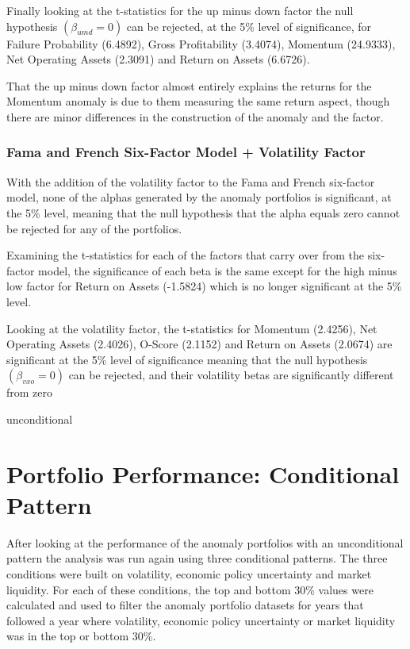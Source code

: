 \documentclass[12pt, a4paper, oneside]{article}
\begin{document}
Finally looking at the t-statistics for the up minus down factor the null hypothesis $(\beta_{umd}= 0)$ can be rejected, at the 5\% level of significance, for Failure Probability (6.4892), Gross Profitability (3.4074), Momentum (24.9333), Net Operating Assets (2.3091) and Return on Assets (6.6726).

That the up minus down factor almost entirely explains the returns for the Momentum anomaly is due to them measuring the same return aspect, though there are minor differences in the construction of the anomaly and the factor.

\subsubsection{Fama and French Six-Factor Model + Volatility Factor}
With the addition of the volatility factor to the Fama and French six-factor model, none of the alphas generated by the anomaly portfolios is significant, at the 5\% level, meaning that the null hypothesis that the alpha equals zero cannot be rejected for any of the portfolios. 

Examining the t-statistics for each of the factors that carry over from the six-factor model, the significance of each beta is the same except for the high minus low factor for Return on Assets (-1.5824) which is no longer significant at the 5\% level. 

Looking at the volatility factor, the t-statistics for Momentum (2.4256), Net Operating Assets (2.4026), O-Score (2.1152) and Return on Assets (2.0674) are significant at the 5\% level of significance meaning that the null hypothesis $(\beta_{vxo}= 0)$ can be rejected, and their volatility betas are significantly different from zero

{unconditional}

\section{Portfolio Performance: Conditional Pattern}\label{sec:conditional}
After looking at the performance of the anomaly portfolios with an unconditional pattern the analysis was run again using three conditional patterns. The three conditions were built on volatility, economic policy uncertainty and market liquidity. For each of these conditions, the top and bottom 30\% values were calculated and used to filter the anomaly portfolio datasets for years that followed a year where volatility, economic policy uncertainty or market liquidity was in the top or bottom 30\%.
\end{document}
